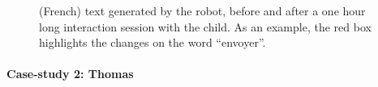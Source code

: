 \documentclass[10pt,a4paper]{article}
\begin{document}
\begin{figure}
    \centering

    \caption{\small (French) text generated by the robot, before and after a one
        hour long interaction session with the child. As an example, the red box
        highlights the changes on the word ``envoyer''.}

    \label{fig:stimuli}
\end{figure}

\paragraph{Case-study 2: Thomas}
\end{document}
